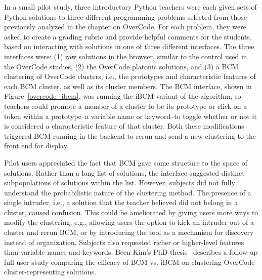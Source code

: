 In a small pilot study, three introductory Python teachers were each given sets of Python solutions to three different programming problems selected from those previously analyzed in the chapter on OverCode. For each problem, they were asked to create a grading rubric and provide helpful comments for the students, based on interacting with solutions in one of three different interfaces. The three interfaces were: (1) raw solutions in the browser, similar to the control used in the OverCode studies, (2) the OverCode platonic solutions, and (3) a BCM clustering of OverCode clusters, i.e., the prototypes and characteristic features of each BCM cluster, as well as its cluster members. The BCM interface, shown in Figure~\ref{overcode_ibcm}, was running the iBCM variant of the algorithm, so teachers could promote a member of a cluster to be its prototype or click on a token within a prototype--a variable name or keyword--to toggle whether or not it is considered a characteristic feature of that cluster. Both these modifications triggered BCM running in the backend to rerun and send a new clustering to the front end for display. 

Pilot users appreciated the fact that BCM gave some structure to the space of solutions. Rather than a long list of solutions, the interface suggested distinct subpopulations of solutions within the list. However, subjects did not fully understand the probabilistic nature of the clustering method. The presence of a single intruder, i.e., a solution that the teacher believed did not belong in a cluster, caused confusion. This could be ameliorated by giving users more ways to modify the clustering, e.g., allowing users the option to kick an intruder out of a cluster and rerun BCM, or by introducing the tool as a mechanism for discovery instead of organization. Subjects also requested richer or higher-level features than variable names and keywords. Been Kim's PhD thesis~\cite{beenthesis} describes a follow-up full user study comparing the efficacy of BCM vs. iBCM on clustering OverCode cluster-representing solutions.

